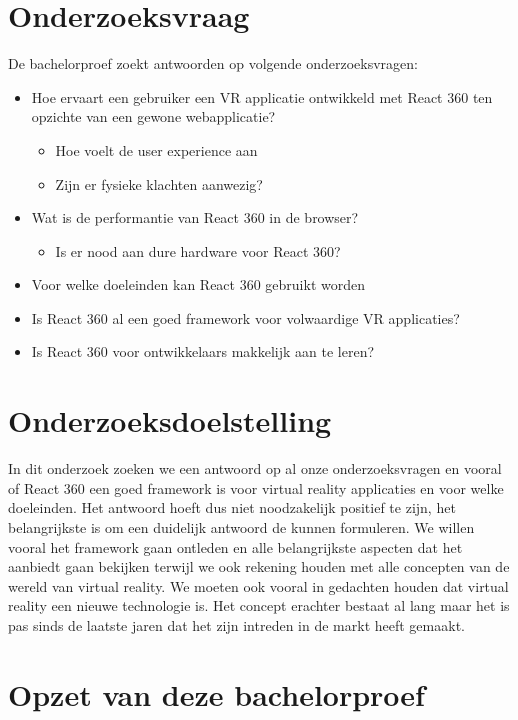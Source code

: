 \section{Onderzoeksvraag}
\label{sec:onderzoeksvraag}

De bachelorproef zoekt antwoorden op volgende onderzoeksvragen:
\begin{itemize}
  \item	Hoe ervaart een gebruiker een VR applicatie ontwikkeld met React 360 ten opzichte van een gewone webapplicatie?
  \begin{itemize}
  \item	Hoe voelt de user experience aan
  \item	Zijn er fysieke klachten aanwezig?
  \end{itemize}
  \item	Wat is de performantie van React 360 in de browser?
\begin{itemize}
	\item Is er nood aan dure hardware voor React 360?
\end{itemize}
  \item	Voor welke doeleinden kan React 360 gebruikt worden
  \item	Is React 360 al een goed framework voor volwaardige VR applicaties?
  \item Is React 360 voor ontwikkelaars makkelijk aan te leren?
\end{itemize}


\section{Onderzoeksdoelstelling}
\label{sec:onderzoeksdoelstelling}

In dit onderzoek zoeken we een antwoord op al onze onderzoeksvragen en vooral of React 360 een goed framework is voor virtual reality applicaties en voor welke doeleinden. Het antwoord hoeft dus niet noodzakelijk positief te zijn, het belangrijkste is om een duidelijk antwoord de kunnen formuleren. We willen vooral het framework gaan ontleden en alle belangrijkste aspecten dat het aanbiedt gaan bekijken terwijl we ook rekening houden met alle concepten van de wereld van virtual reality. We moeten ook vooral in gedachten houden dat virtual reality een nieuwe technologie is. Het concept erachter bestaat al lang maar het is pas sinds de laatste jaren dat het zijn intreden in de markt heeft gemaakt.

\section{Opzet van deze bachelorproef}
\label{sec:opzet-bachelorproef}

